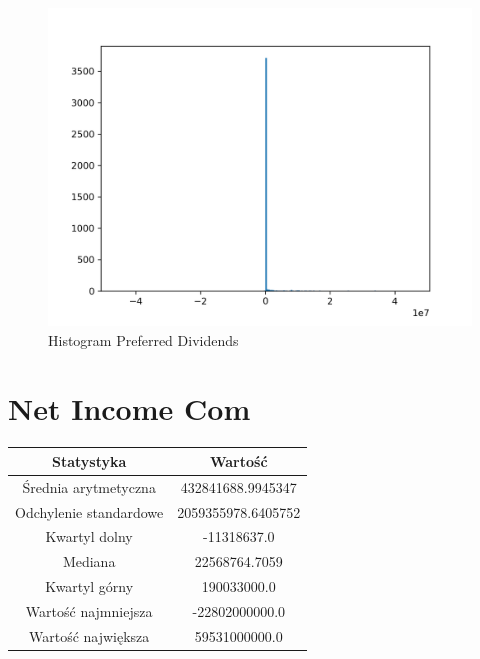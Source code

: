\documentclass{article}
\begin{document}
\begin{figure}[h!]
    \includegraphics[width=\linewidth]{variables/Preferred Dividends.png}
    \caption{Histogram Preferred Dividends }
\end{figure}\section{ Net Income Com }

\begin{center}
    \begin{tabular}{|c | c|} 
    \hline
    Statystyka & Wartość \\
    \hline\hline
    Średnia arytmetyczna & 432841688.9945347 \\ 
    \hline
    Odchylenie standardowe & 2059355978.6405752 \\
    \hline
    Kwartyl dolny & -11318637.0 \\
    \hline
    Mediana & 22568764.7059 \\
    \hline
    Kwartyl górny & 190033000.0 \\
    \hline
    Wartość najmniejsza & -22802000000.0 \\
    \hline
    Wartość największa & 59531000000.0 \\
    \hline
   \end{tabular}
\end{center}
\end{document}
